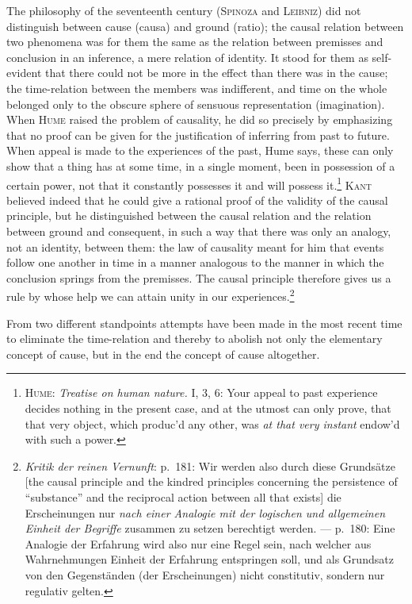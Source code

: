 \documentclass[12pt,a4paper]{book}
\newcommand{\opage}[1]{\marginnote{\footnotesize\textit{[#1]}}}
\begin{document}
The philosophy of the seventeenth century (\textsc{Spinoza} and
\textsc{Leibniz}) did not distinguish between cause (causa) and ground (ratio);
the causal relation between two phenomena was for them the same as the relation
between premisses and conclusion in an inference, a mere relation of identity. It
stood for them as self-evident that there could not be more in the effect than
there was in the cause; the time-relation between the members was indifferent,
and time on the whole belonged only to the obscure sphere of sensuous
representation (imagination). When \textsc{Hume} raised the problem of causality,
he did so precisely by emphasizing that no proof can be given for the
justification of inferring from past to future. When appeal is made to the
experiences of the past, Hume says, these can only show that a thing has at some
time, in a single moment, been in possession of a certain power, not that it
constantly possesses it and will possess it.\footnote{\textsc{Hume}:
\textit{Treatise on human nature.} I, 3, 6: Your appeal to past experience
decides nothing in the present case, and at the utmost can only prove, that that
very object, which produc'd any other, was \textit{at that very instant} endow'd
with such a power.} \textsc{Kant} believed indeed that he could give a rational
proof of \opage{44}the validity of the causal principle, but he distinguished between the
causal relation and the relation between ground and consequent, in such a way
that there was only an analogy, not an identity, between them: the law of
causality meant for him that events follow one another in time in a manner
analogous to the manner in which the conclusion springs from the premisses. The
causal principle therefore gives us a rule by whose help we can attain unity in
our experiences.\footnote{\textit{Kritik der reinen Vernunft}: p.~181: Wir werden
also durch diese Grundsätze [the causal principle and the kindred principles
concerning the persistence of ``substance'' and the reciprocal action between all
that exists] die Erscheinungen nur \textit{nach einer Analogie mit der logischen
und allgemeinen Einheit der Begriffe} zusammen zu setzen berechtigt werden. ---
p.~180: Eine Analogie der Erfahrung wird also nur eine Regel sein, nach welcher
aus Wahrnehmungen Einheit der Erfahrung entspringen soll, und als Grundsatz von
den Gegenständen (der Erscheinungen) nicht constitutiv, sondern nur regulativ
gelten.}

From two different standpoints attempts have been made in the most recent time
to eliminate the time-relation and thereby to abolish not only the elementary
concept of cause, but in the end the concept of cause altogether.
\end{document}
